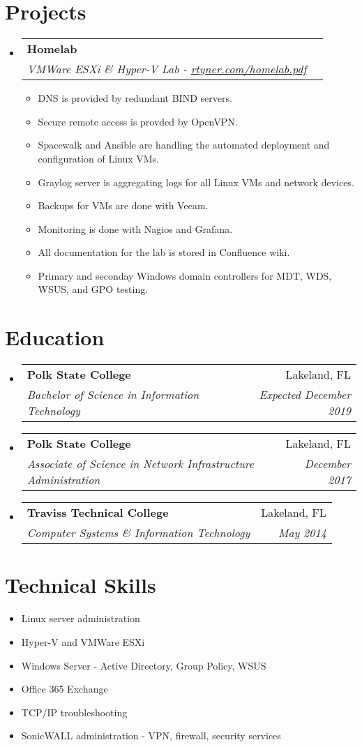 \documentclass[letterpaper,11pt]{article}
\makeatletter
\newcommand{\resumeItem}[2]{
  \item\small{
    \textbf{}{#2 \vspace{-2pt}}
  }
}
\newcommand{\resumeSubheading}[4]{
  \vspace{-1pt}\item
    \begin{tabular*}{0.97\textwidth}{l@{\extracolsep{\fill}}r}
      \textbf{#1} & #2 \\
      \textit{\small#3} & \textit{\small #4} \\
    \end{tabular*}\vspace{-5pt}
}
\newcommand{\resumeSubItem}[2]{\resumeItem{#1}{#2}\vspace{-4pt}}
\newcommand{\resumeSubHeadingListStart}{\begin{itemize}[leftmargin=*]}
\newcommand{\resumeSubHeadingListEnd}{\end{itemize}}
\newcommand{\resumeItemListStart}{\begin{itemize}}
\newcommand{\resumeItemListEnd}{\end{itemize}\vspace{-5pt}}
\makeatother
\begin{document}
\section{Projects}
  \resumeSubHeadingListStart
    \resumeSubheading
      {Homelab}{}
      {VMWare ESXi \& Hyper-V Lab - \href{https://rtyner.com/homelab.pdf}{rtyner.com/homelab.pdf}}{}
      \resumeItemListStart
        \resumeItem{}
          {DNS is provided by redundant BIND servers.}
        \resumeItem{}
          {Secure remote access is provded by OpenVPN.}
        \resumeItem{}
          {Spacewalk and Ansible are handling the automated deployment and configuration of Linux VMs.}
        \resumeItem{}
          {Graylog server is aggregating logs for all Linux VMs and network devices.}
        \resumeItem{}
          {Backups for VMs are done with Veeam.}
        \resumeItem{}
          {Monitoring is done with Nagios and Grafana.}
        \resumeItem{}
          {All documentation for the lab is stored in Confluence wiki.}
        \resumeItem{}
          {Primary and seconday Windows domain controllers for MDT, WDS, WSUS, and GPO testing.}
      \resumeItemListEnd
  \resumeSubHeadingListEnd

\section{Education}
  \resumeSubHeadingListStart
    \resumeSubheading
      {Polk State College}{Lakeland, FL}
      {Bachelor of Science in Information Technology}{Expected December 2019}
    \resumeSubheading
      {Polk State College}{Lakeland, FL}
      {Associate of Science in Network Infrastructure Administration}{December 2017}
    \resumeSubheading
      {Traviss Technical College}{Lakeland, FL}
      {Computer Systems \& Information Technology}{May 2014}
  \resumeSubHeadingListEnd

\section{Technical Skills}
  \resumeSubHeadingListStart
    \resumeSubItem{}
      {Linux server administration}
    \resumeSubItem{}
      {Hyper-V and VMWare ESXi}    
    \resumeSubItem{}
      {Windows Server - Active Directory, Group Policy, WSUS}
    \resumeSubItem{}
      {Office 365 Exchange}
    \resumeSubItem{}
      {TCP/IP troubleshooting}
    \resumeSubItem{}
      {SonicWALL administration - VPN, firewall, security services}
  \resumeSubHeadingListEnd
\end{document}
